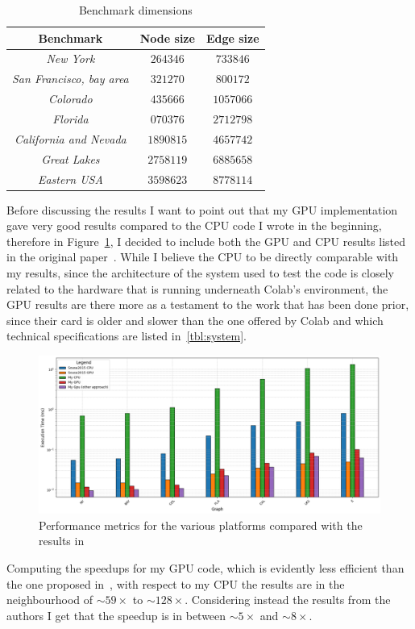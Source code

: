 \documentclass[a4paper,10pt]{article}
\begin{document}
\begin{longtable}{|c|c|c|}
	\caption{Benchmark dimensions}\label{tbl:benchmarks}
	\\\hline\textbf{Benchmark} & \textbf{Node size} & \textbf{Edge size} \\\hline\hline
	\endfirsthead\hline\endlastfoot

	\textit{New York}                & $\num{264346}$   & $\num{733846}$  \\\hline
	\textit{San Francisco, bay area} & $\num{321270}$   & $\num{800172}$  \\\hline
	\textit{Colorado}                & $\num{435666}$   & $\num{1057066}$ \\\hline
	\textit{Florida}                 & $\num{ 070376}$  & $\num{2712798}$ \\\hline
	\textit{California and Nevada}   & $\num{ 1890815}$ & $\num{4657742}$ \\\hline
	\textit{Great Lakes}             & $\num{2758119}$  & $\num{6885658}$ \\\hline
	\textit{Eastern USA}             & $\num{3598623}$  & $\num{8778114}$
\end{longtable}
Before discussing the results I want to point out that my GPU implementation gave very good results compared to the CPU code I wrote in the beginning, therefore in Figure~\ref{fig:results}, I decided to include both the GPU and CPU results listed in the original paper~\cite{generic-he-boruvka}. While I believe the CPU to be directly comparable with my results, since the architecture of the system used to test the code is closely related to the hardware that is running underneath Colab's environment, the GPU results are there more as a testament to the work that has been done prior, since their card is older and slower than the one offered by Colab and which technical specifications are listed in~\ref{tbl:system}.
\begin{figure}
	\centering
	\includegraphics[scale=0.4]{fig/benchmarks.png}
	\caption{Performance metrics for the various platforms compared with the results in \cite{generic-he-boruvka}}
	\label{fig:results}
\end{figure}
Computing the speedups for my GPU code, which is evidently less efficient than the one proposed in~\cite{generic-he-boruvka}, with respect to my CPU the results are in the neighbourhood of $\sim59\times$ to $\sim128\times$. Considering instead the results from the authors I get that the speedup is in between $\sim5\times$ and $\sim8\times$.
\end{document}
